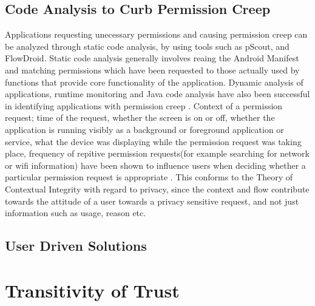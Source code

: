 \subsection{Code Analysis to Curb Permission Creep}
Applications requesting unecessary permissions and causing permission creep can be analyzed through static code analysis, by using tools such as pScout\cite{au2012pscout}, and FlowDroid\cite{arzt2014flowdroid}. Static code analysis generally involves reaing the Android Manifest and matching permissions which have been requested to those actually used by functions that provide core functionality of the application. Dynamic analysis of applications, runtime monitoring and Java code analysis have also been successful in identifying applications with permission creep \cite{spreitzenbarth2013mobile}. Context of a permission request; time of the request, whether the screen is on or off, whether the application is running visibly as a background or foreground application or service, what the device was displaying while the permission request was taking place, frequency of repitive permission requests(for example searching for network or wifi information) have been shown to influence users when deciding whether a particular permission request is appropriate \cite{wijesekera2015android}. This conforms to the Theory of Contextual Integrity\cite{nissenbaum2004privacy} with regard to privacy, since the context and flow contribute towards the attitude of a user towards a privacy sensitive request, and not just information such as usage, reason etc.

\subsection{User Driven Solutions}



\section{Transitivity of Trust}